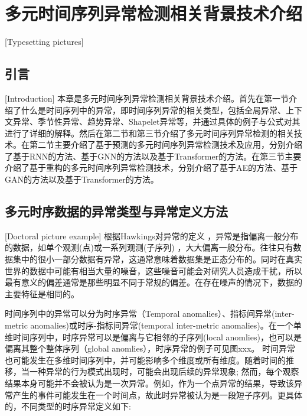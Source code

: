 
\chapter{多元时间序列异常检测相关背景技术介绍}[Typesetting pictures]

\section{引言}[Introduction]
本章是多元时间序列异常检测相关背景技术介绍。首先在第一节介绍了什么是时间序列中的异常，即时间序列异常的相关类型，包括全局异常、上下文异常、季节性异常、趋势异常、Shapelet异常等，并通过具体的例子与公式对其进行了详细的解释。然后在第二节和第三节介绍了多元时间序列异常检测的相关技术。在第二节主要介绍了基于预测的多元时间序列异常检测技术及应用，分别介绍了基于RNN的方法、基于GNN的方法以及基于Transformer的方法。在第三节主要介绍了基于重构的多元时间序列异常检测技术，分别介绍了基于AE的方法、基于GAN的方法以及基于Transformer的方法。

\section{多元时序数据的异常类型与异常定义方法}[Doctoral picture example]
根据Hawkings\cite{hawkings}对异常的定义 ，异常是指偏离一般分布的数据，如单个观测(点)或一系列观测(子序列) ，大大偏离一般分布。往往只有数据集中的很小一部分数据有异常，这通常意味着数据集是正态分布的。同时在真实世界的数据中可能有相当大量的噪音，这些噪音可能会对研究人员造成干扰，所以最有意义的偏差通常是那些明显不同于常规的偏差。在存在噪声的情况下，数据的主要特征是相同的。

时间序列中的异常可以分为时序异常（Temporal anomalies）、指标间异常(inter-metric anomalies)或时序-指标间异常(temporal inter-metric anomalies)\cite{aiops2022}。在一个单维时间序列中，时序异常可以是偏离与它相邻的子序列(local anomlies)，也可以是偏离其整个整体序列（global anomlies），时序异常的例子可见图xxx。
时间异常也可能发生在多维时间序列中，并可能影响多个维度或所有维度。随着时间的推移，当一种异常的行为模式出现时，可能会出现后续的异常现象; 然而，每个观察结果本身可能并不会被认为是一次异常。例如，作为一个点异常的结果，导致该异常产生的事件可能发生在一个时间点，故此时异常被认为是一段短子序列。更具体的，不同类型的时序异常定义如下:

